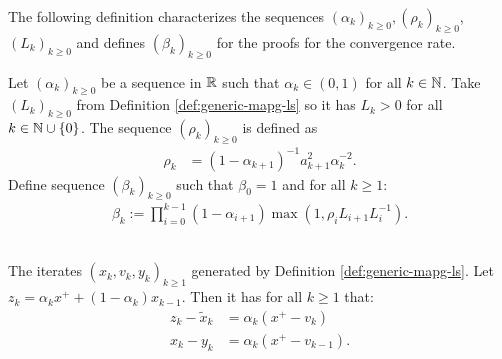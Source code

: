 \documentclass[12pt]{report}
\begin{document}
        The following definition characterizes the sequences $(\alpha_k)_{k \ge 0}, (\rho_k)_{k \ge 0}$, $(L_k)_{k \ge 0}$ and defines $(\beta_k)_{k \ge 0}$ for the proofs for the convergence rate. 
        \begin{definition}\label{def:alpha-beta-rho-seq}
            Let $(\alpha_k)_{k \ge 0}$ be a sequence in $\mathbb R$ such that $\alpha_k \in (0, 1)$ for all $k \in \mathbb N$. 
            Take $(L_k)_{k \ge 0}$ from Definition \ref{def:generic-mapg-ls} so it has $L_k > 0$ for all $k \in \mathbb N \cup \{0\}$. 
            The sequence $(\rho_k)_{k \ge 0}$ is defined as 
            \begin{align*}
               \rho_{k} &= (1 - \alpha_{k + 1})^{-1}a_{k + 1}^2\alpha_k^{-2}. 
            \end{align*}
            Define sequence $(\beta_k)_{k \ge 0}$ such that $\beta_0 = 1$ and for all $k \ge 1$: 
            \begin{align*}
                \beta_k := \prod_{i = 0}^{k - 1} (1 - \alpha_{i + 1})\max\left(1, \rho_i L_{i + 1}L_i^{-1}\right). 
            \end{align*}
        \end{definition}
        \begin{lemma}\;\label{lemma:apg-iterates}\;\\
            The iterates $(x_k, v_k, y_k)_{k \ge 1}$ generated by Definition \ref{def:generic-mapg-ls}. 
            Let $z_k = \alpha_k x^+ + (1 - \alpha_k)x_{k - 1}$. 
            Then it has for all $k \ge 1$ that: 
            \begin{align*}
                z_k - \tilde x_k &= \alpha_k(x^+ - v_k)
                \\
                x_k - y_k &= \alpha_k(x^+ - v_{k - 1}). 
            \end{align*}
        \end{lemma}
\end{document}
